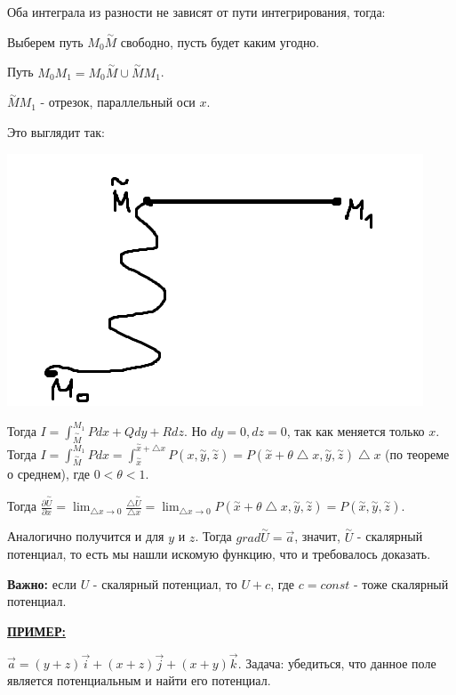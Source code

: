 \documentclass[12pt]{article}
\begin{document}
Оба интеграла из разности не зависят от пути интегрирования, тогда:\par
Выберем путь $M_0 \overset{\sim}{M}$ свободно, пусть будет каким угодно.\par
Путь $M_0 M_1 = M_0 \overset{\sim}{M} \cup \overset{\sim}{M} M_1$.\par
$\overset{\sim}{M} M_1$ - отрезок, параллельный оси $x$.\par
Это выглядит так:\par
\includegraphics{potentialFields1}\par
Тогда $I = \int_{\overset{\sim}{M}}^{M_1} Pdx + Qdy + Rdz$. Но $dy = 0, dz = 0$, так как меняется только $x$. Тогда $I = \int_{\overset{\sim}{M}}^{M_1} Pdx = \int_{\overset{\sim}{x}}^{\overset{\sim}{x}+{\bigtriangleup x}} P(x, \overset{\sim}{y}, \overset{\sim}{z}) = P(\overset{\sim}{x}+\theta \bigtriangleup x, \overset{\sim}{y}, \overset{\sim}{z}) \bigtriangleup x$ (по теореме о среднем), где $0 < \theta < 1$.\par
Тогда $\frac{\partial \overset{\sim}{U}}{\partial x} = \lim_{\bigtriangleup x \to 0} \frac{\bigtriangleup \overset{\sim}{U}}{\bigtriangleup x} = \lim_{\bigtriangleup x \to 0} P(\overset{\sim}{x}+\theta \bigtriangleup x, \overset{\sim}{y}, \overset{\sim}{z}) = P(\overset{\sim}{x}, \overset{\sim}{y}, \overset{\sim}{z})$.\par
Аналогично получится и для $y$ и $z$. Тогда $grad \overset{\sim}{U} = \overrightarrow{a}$, значит, $\overset{\sim}{U}$ - скалярный потенциал, то есть мы нашли искомую функцию, что и требовалось доказать.\par
\textbf{Важно:} если $U$ - скалярный потенциал, то $U + c$, где $c = const$ - тоже скалярный потенциал.\par
\uline{\textbf{ПРИМЕР:}}\par
$\overrightarrow{a} = (y+z) \overrightarrow{i} + (x+z) \overrightarrow{j} + (x+y)\overrightarrow{k}$. Задача: убедиться, что данное поле является потенциальным и найти его потенциал.\par
\end{document}
